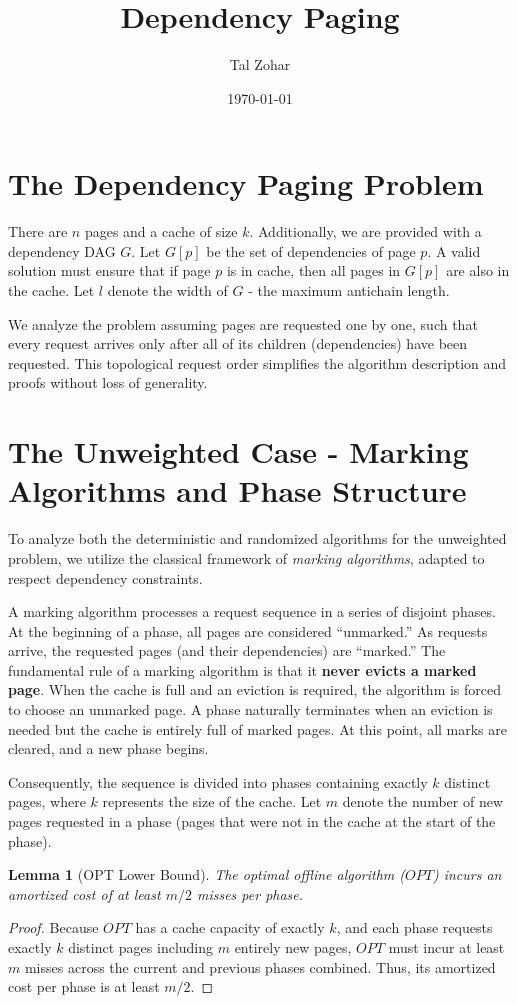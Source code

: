 \documentclass[a4paper]{article}
\title{Dependency Paging}
\author{Tal Zohar}
\date{\today}
\newtheorem{lemma}{Lemma}      %
\begin{document}
\maketitle

\section{The Dependency Paging Problem}
There are $n$ pages and a cache of size $k$.
Additionally, we are provided with a dependency DAG $G$.
Let $G[p]$ be the set of dependencies of page $p$.
A valid solution must ensure that if page $p$ is in cache, then all pages in $G[p]$ are also in the cache.
Let $l$ denote the width of $G$ - the maximum antichain length.

We analyze the problem assuming pages are requested one by one, such that every request arrives only after all of its children (dependencies) have been requested. This topological request order simplifies the algorithm description and proofs without loss of generality.

\section{The Unweighted Case - Marking Algorithms and Phase Structure}
To analyze both the deterministic and randomized algorithms for the unweighted problem, we utilize the classical framework of \textit{marking algorithms}, adapted to respect dependency constraints. 

A marking algorithm processes a request sequence in a series of disjoint phases. At the beginning of a phase, all pages are considered ``unmarked.'' As requests arrive, the requested pages (and their dependencies) are ``marked.'' The fundamental rule of a marking algorithm is that it \textbf{never evicts a marked page}. When the cache is full and an eviction is required, the algorithm is forced to choose an unmarked page. A phase naturally terminates when an eviction is needed but the cache is entirely full of marked pages. At this point, all marks are cleared, and a new phase begins.

Consequently, the sequence is divided into phases containing exactly $k$ distinct pages, where $k$ represents the size of the cache. Let $m$ denote the number of new pages requested in a phase (pages that were not in the cache at the start of the phase). 

\begin{lemma}[OPT Lower Bound]
\label{lemma:opt_bound}
The optimal offline algorithm ($OPT$) incurs an amortized cost of at least $m/2$ misses per phase.
\end{lemma}
\begin{proof}
Because $OPT$ has a cache capacity of exactly $k$, and each phase requests exactly $k$ distinct pages including $m$ entirely new pages, $OPT$ must incur at least $m$ misses across the current and previous phases combined. Thus, its amortized cost per phase is at least $m/2$.
\end{proof}
\end{document}
